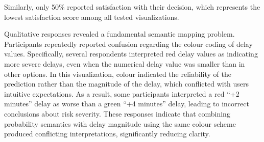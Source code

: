 \documentclass[final,journal,a4paper]{IEEEtran}
\begin{document}
Similarly, only 50\% reported satisfaction with their decision, which represents the lowest satisfaction score among all tested visualizations.

Qualitative responses revealed a fundamental semantic mapping problem. Participants repeatedly reported confusion regarding the colour coding of delay values. Specifically, several respondents interpreted red delay values as indicating more severe delays, even when the numerical delay value was smaller than in other options. In this visualization, colour indicated the reliability of the prediction rather than the magnitude of the delay, which conflicted with users intuitive expectations. As a result, some participants interpreted a red ``+2 minutes'' delay as worse than a green ``+4 minutes'' delay, leading to incorrect conclusions about risk severity. These responses indicate that combining probability semantics with delay magnitude using the same colour scheme produced conflicting interpretations, significantly reducing clarity.
\end{document}
